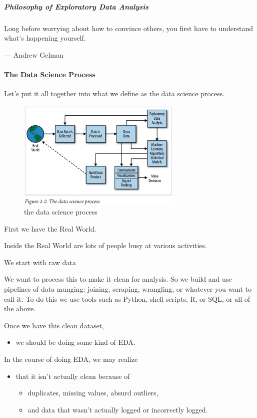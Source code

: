 \documentclass[]{article}
\providecommand{\tightlist}{%
  \setlength{\itemsep}{0pt}\setlength{\parskip}{0pt}}
\let\oldparagraph\paragraph
\renewcommand{\paragraph}[1]{\oldparagraph{#1}\mbox{}}
\let\oldsubparagraph\subparagraph
\renewcommand{\subparagraph}[1]{\oldsubparagraph{#1}\mbox{}}
\begin{document}
\subparagraph{Philosophy of Exploratory Data
Analysis}\label{philosophy-of-exploratory-data-analysis}

Long before worrying about how to convince others, you first have to
understand what's happening yourself.

--- Andrew Gelman

\paragraph{The Data Science Process}\label{the-data-science-process}

Let's put it all together into what we define as the data science
process.

\begin{figure}
\centering
\includegraphics[width=0.70000\textwidth]{figs/9a-3.png}
\caption{the data science process}
\end{figure}

First we have the Real World.

Inside the Real World are lots of people busy at various activities.

We start with raw data

We want to process this to make it clean for analysis. So we build and
use pipelines of data munging: joining, scraping, wrangling, or whatever
you want to call it. To do this we use tools such as Python, shell
scripts, R, or SQL, or all of the above.

Once we have this clean dataset,

\begin{itemize}
\tightlist
\item
  we should be doing some kind of EDA.
\end{itemize}

In the course of doing EDA, we may realize

\begin{itemize}
\tightlist
\item
  that it isn't actually clean because of

  \begin{itemize}
  \tightlist
  \item
    duplicates, missing values, absurd outliers,
  \item
    and data that wasn't actually logged or incorrectly logged.
  \end{itemize}
\end{itemize}
\end{document}
